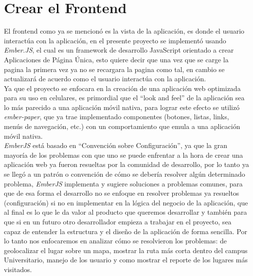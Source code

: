 \section{Crear el Frontend}
\label{sec:Crear el Frontend}


El frontend como ya se mencionó es la vista de la aplicación, es donde el usuario interactúa con la aplicación, en el presente proyecto se implementó usando \emph{Ember.JS}, el cual es un framework de desarrollo JavaScript orientado a crear Aplicaciones de Página Única, esto quiere decir que una vez que se carge la pagina la primera vez ya no se recargara la pagina como tal, en cambio se actualizará de acuerdo como el usuario interactúa con la aplicación.\\

Ya que el proyecto se enfocara en la creación de una aplicación web optimizada para su uso en celulares, es primordial que el ``look and feel'' de la aplicación sea lo más parecido a una aplicación móvil nativa, para lograr este efecto se utilizó \emph{ember-paper}, que ya trae implementado componentes (botones, listas, links, menús de navegación, etc.) con un comportamiento que emula a una aplicación móvil nativa.\\


\emph{EmberJS} está basado en ``Convención sobre Configuración'', ya que la gran mayoría de los problemas con que uno se puede enfrentar a la hora de crear una aplicación web ya fueron resueltas por la comunidad de desarrollo, por lo tanto ya se llegó a un patrón o convención de cómo se debería resolver algún determinado problema, \emph{EmberJS} implementa y sugiere soluciones a problemas comunes, para que de esa forma el desarrollo no se enfoque  en resolver problemas ya resueltos (configuración) si no en implementar en la lógica del negocio de la aplicación, que al final es lo que le da valor al producto que queremos desarrollar y también para que si en un futuro otro desarrollador empieza a trabajar en el proyecto, sea capaz de entender la estructura y el diseño de la aplicación de forma sencilla. Por lo tanto nos enfocaremos en analizar cómo se resolvieron los problemas: de geolocalizar el lugar sobre un mapa, mostrar la ruta más corta dentro del campus Universitario, manejo de los usuario y como mostrar el reporte de los lugares más visitados.


